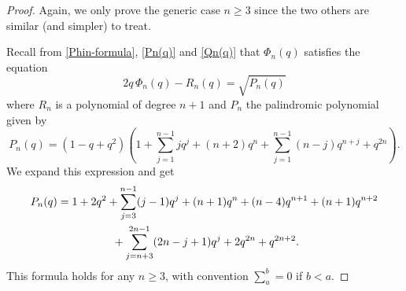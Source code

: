 \documentclass[11pt,reqno]{amsart}
\theoremstyle{plain}
\theoremstyle{definition}
\numberwithin{figure}{section}
\numberwithin{table}{section}
\numberwithin{equation}{section}
\begin{document}
\begin{proof} Again, we only prove the generic case $n≥3$ since the two others are similar (and simpler) to treat.

Recall from \eqref{Phin-formula}, \eqref{Pn(q)} and \eqref{Qn(q)} that $\Phi_n(q)$ satisfies the equation
\begin{equation*}
2q\,\Phi_n(q)-R_n(q)=\sqrt{P_n(q)}
\end{equation*}
where $R_n$ is a polynomial of degree $n+1$ and $P_n$  the palindromic polynomial given by
\begin{equation*}
P_n(q)=(1-q+q^2)\left(1+\sum_{j=1}^{n-1}j q^j+(n+2)q^n+\sum_{j=1}^{n-1}(n-j)q^{n+j}+q^{2n}\right).
\end{equation*}
We expand this expression and get
\begin{equation}\label{Pn(q)2}
\begin{split}
P_n(q)&=1+2q^2+\sum_{j=3}^{n-1}(j-1) q^j+(n+1)q^n+(n-4)q^{n+1}+(n+1)q^{n+2}\\
&\hskip 5em+\sum_{j=n+3}^{2n-1}(2n-j+1)q^{j}+2q^{2n}+q^{2n+2}.
\end{split}
\end{equation}
This formula holds for any $n≥3$, with convention $\sum_a^b=0$ if $b<a$.


\end{proof}
\end{document}
